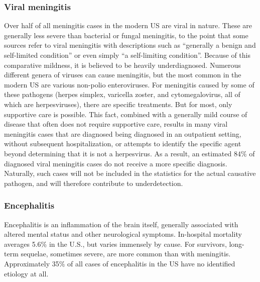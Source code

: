 \documentclass[12pt]{article}
\newcommand{\cjh}{\textcolor{blue}{cjh}}
\newcommand{\msg}[3]{(#1 $\rightarrow$ #2: #3)}
\newcommand{\mcc}[1]{\msg\cjh\cjh{#1}}
\begin{document}
        \subsubsection{Viral meningitis}
            \label{viral-meningitis}
            Over half of all meningitis cases in the modern US are viral in nature. These are generally less severe than bacterial or fungal meningitis, to the point that some sources refer to viral meningitis with descriptions such as ``generally a benign and self-limited condition''\cite{khetsuriani2003viral} or even simply ``a self-limiting condition''\cite{balada2019cost}. Because of this comparative mildness, it is believed to be heavily underdiagnosed. Numerous different genera of viruses can cause meningitis, but the most common in the modern US are various non-polio enteroviruses. For meningitis caused by some of these pathogens (herpes simplex, varicella zoster, and cytomegalovirus, all of which are herpesviruses), there are specific treatments. But for most, only supportive care is possible. This fact, combined with a generally mild course of disease that often does not require supportive care, results in many viral meningitis cases that are diagnosed being diagnosed in an outpatient setting, without subsequent hospitalization, or attempts to identify the specific agent beyond determining that it is not a herpesvirus. As a result, an estimated $84\%$ of diagnosed viral meningitis cases do not receive a more specific diagnosis\cite{holmquist2008meningitis}. Naturally, such cases will not be included in the statistics for the actual causative pathogen, and will therefore contribute to underdetection.

        \subsubsection{Encephalitis}
            \label{encephalitis}

            Encephalitis is an inflammation of the brain itself, generally associated with altered mental status and other neurological symptoms. In-hospital mortality averages 5.6\% in the U.S., but varies immensely by cause. For survivors, long-term sequelae, sometimes severe, are more common than with meningitis. Approximately 35\% of all cases of encephalitis in the US have no identified etiology at all\cite{george2014encephalitis}.
            
\end{document}
